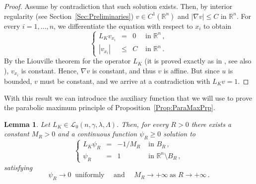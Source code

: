 \documentclass[12pt,reqno]{amsart}
\newtheorem{lemma}[theorem]{Lemma}
\theoremstyle{definition}
\theoremstyle{remark}
\newcommand{\con}[1]{\mathbb{#1}}
\newcommand{\R}{\con{R}} %
\newcommand{\lcal}{\mathcal{L}}
\newcommand{\s}{\gamma}
\newcommand\beqc[1]{\left\{\begin{array}{#1}}
\newcommand\eeqc{\end{array} \right.}
\def\PDEsystem{rcll}
\numberwithin{equation}{section}
\begin{document}
\begin{proof}
	Assume by contradiction that such solution exists. Then, by interior regularity (see Section~\ref{Sec:Preliminaries}) $v\in C^1(\R^n)$ and $|\nabla v|\leq C$ in $\R^n$. For every $i = 1,\ldots, n$, we differentiate the equation with respect to $x_i$ to obtain
	\begin{equation*}
	\beqc{\PDEsystem}
	L_K  v_{x_i} &=& 0 & \textrm{ in } \R^n\,,\\
	|v_{x_i}| &\leq& C & \textrm{ in } \R^n\,.
	\eeqc
	\end{equation*}
	By the Liouville theorem for the operator $L_K $ (it is proved exactly as in \cite{RosOtonSerra-Stable}, see also \cite{SerraC2s+alphaRegularity}), $v_{x_i}$ is constant. Hence, $\nabla v$ is constant, and thus $v$ is affine. But since $u$ is bounded, $v$ must be constant, and we arrive at a contradiction with $L_K v=1$.
\end{proof}

With this result we can introduce the auxiliary function that we will use to prove the parabolic maximum principle of Proposition~\ref{Prop:ParaMaxPrp}.

\begin{lemma}
	\label{Lemma:SolBallToZero}
	Let $L_K \in \lcal_0(n,\s,\lambda, \Lambda)$. Then, for every $R>0$ there exists a constant $M_R>0$ and a continuous function $\psi_R\geq 0$ solution to
	\begin{equation}
	\label{Eq:psiRProblem}
	\beqc{\PDEsystem}
	L_K  \psi_R &=& -1/M_R & \textrm{ in } B_R\,,\\
	\psi_R &=& 1 & \textrm{ in } \R^n\setminus B_R\,,
	\eeqc
	\end{equation}
	satisfying 
	$$
	\psi_R \to  0 \ \text{ uniformly } \quad \text{and } \quad M_R  \to +\infty \ \text{as } R\to +\infty\,.
	$$
\end{lemma}
\end{document}
